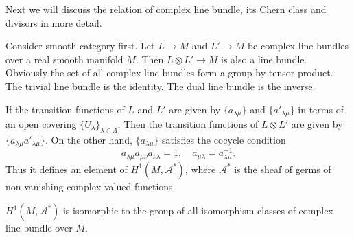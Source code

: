 \documentclass[12pt]{article}
\begin{document}
Next we will discuss the relation of complex line bundle, its Chern class and
divisors in more detail.

Consider smooth category first. Let \(L\to M\) and \(L'\to M\) be complex line
bundles over a real smooth manifold \(M\). Then \(L\otimes L'\to M\) is also a line
bundle. Obviously the set of all complex line bundles form a group by tensor product.
The trivial line bundle is the identity. The dual line bundle is the inverse.

If the transition functions of \(L\) and \(L'\) are given by \(\{a_{\lambda\mu}\}\) and
\(\{a'_{\lambda\mu}\}\) in terms of an open covering \(\{U_{\lambda}\}_{\lambda\in
\Lambda}\). Then the transition functions of \(L\otimes L'\) are given by 
\(\{a_{\lambda\mu}a'_{\lambda\mu}\}\). On the other hand, \(\{a_{\lambda\mu}\}\)
satisfies the cocycle condition \[
  a_{\lambda\mu}a_{\mu\nu}a_{\nu\lambda}=1,\quad
  a_{\mu\lambda}=a_{\lambda\mu}^{-1}
.\] Thus it defines an element of \(H^1(M,\mathscr{A}^*)\), where \(\mathscr{A}^*\)
is the sheaf of germs of non-vanishing complex valued functions.

\begin{prop}
  \(H^1(M,\mathscr{A}^*)\) is isomorphic to the group of all isomorphism classes 
  of complex line bundle over \(M\).
\end{prop}
\end{document}
